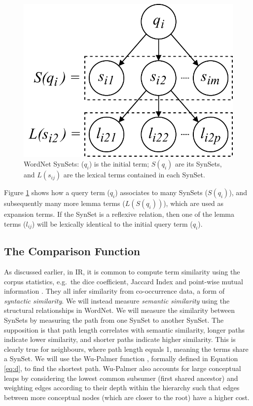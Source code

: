 \begin{figure}
    \centering
    \includegraphics[width=0.6\linewidth]{graphics/lemma_diagram.pdf} 
    \caption{WordNet SynSets: ($q_i$) is the initial term; $S(q_i)$ are its SynSets, and $L(s_{ij})$ are the lexical terms contained in each SynSet.}
    \label{fig:wn}
\end{figure}

\noindent
Figure \ref{fig:wn} shows how a query term ($q_i$) associates to many SynSets ($S(q_i)$), and subsequently many more lemma terms ($L(S(q_i))$), which are used as expansion terms. If the SynSet is a reflexive relation, then one of the lemma terms ($l_{ij}$) will be lexically identical to the initial query term ($q_i$).


\subsection{The Comparison Function}
As discussed earlier, in IR, it is common to compute term similarity using the corpus statistics, e.g.\ the dice coefficient, Jaccard Index and point-wise mutual information \cite{Carpineto:2012:SAQ:2071389.2071390}. They all infer similarity from co-occurrence data, a form of \textit{syntactic similarity}. We will instead measure \textit{semantic similarity} using the structural relationships in WordNet. We will measure the similarity between SynSets by measuring the path from one SynSet to another SynSet. The supposition is that path length correlates with semantic similarity, longer paths indicate lower similarity, and shorter paths indicate higher similarity. This is clearly true for neighbours, where path length equals 1, meaning the terms share a SynSet. We will use the Wu-Palmer function \cite{Wu:1994:VSL:981732.981751}, formally defined in Equation \ref{eq:d}, to find the shortest path. Wu-Palmer also accounts for large conceptual leaps by considering the lowest common subsumer (first shared ancestor) and weighting edges according to their depth within the hierarchy such that edges between more conceptual nodes (which are closer to the root) have a higher cost. 

